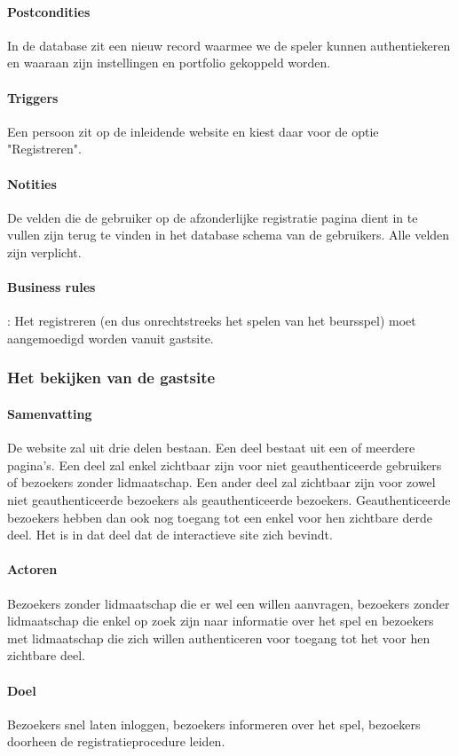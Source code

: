 \paragraph{Postcondities}In de database zit een nieuw record waarmee we de speler kunnen authentiekeren en waaraan zijn instellingen en portfolio gekoppeld worden.
\paragraph{Triggers}Een persoon zit op de inleidende website en kiest daar voor de optie "Registreren".
\paragraph{Notities}De velden die de gebruiker op de afzonderlijke registratie pagina dient in te vullen zijn terug te vinden in het database schema van de gebruikers. Alle velden zijn verplicht.
\paragraph{Business rules}: Het registreren (en dus onrechtstreeks het spelen van het beursspel) moet aangemoedigd worden vanuit gastsite.


\subsubsection{Het bekijken van de gastsite}
\paragraph{Samenvatting}De website zal uit drie delen bestaan. Een deel bestaat uit een of meerdere pagina's. Een deel zal enkel zichtbaar zijn voor niet geauthenticeerde gebruikers of bezoekers zonder lidmaatschap. Een ander deel zal zichtbaar zijn voor zowel niet geauthenticeerde bezoekers als geauthenticeerde bezoekers. Geauthenticeerde bezoekers hebben dan ook nog toegang tot een enkel voor hen zichtbare derde deel. Het is in dat deel dat de interactieve site zich bevindt.
\paragraph{Actoren} Bezoekers zonder lidmaatschap die er wel een willen aanvragen, bezoekers zonder lidmaatschap die enkel op zoek zijn naar informatie over het spel en bezoekers met lidmaatschap die zich willen authenticeren voor toegang tot het voor hen zichtbare deel.
\paragraph{Doel} Bezoekers snel laten inloggen, bezoekers informeren over het spel, bezoekers doorheen de registratieprocedure leiden.

